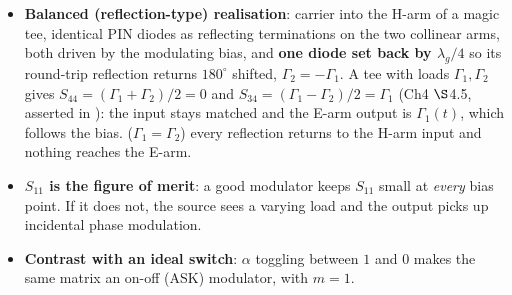 \begin{itemize}
  \item \textbf{Balanced (reflection-type) realisation}: carrier into the H-arm of a magic
    tee, identical PIN diodes as reflecting terminations on the two collinear arms, both
    driven by the modulating bias, and \textbf{one diode set back by $\lambda_g/4$} so its
    round-trip reflection returns $180^\circ$ shifted, $\Gamma_2 = -\Gamma_1$. A tee with
    loads $\Gamma_1, \Gamma_2$ gives $S_{44} = (\Gamma_1 + \Gamma_2)/2 = 0$ and
    $S_{34} = (\Gamma_1 - \Gamma_2)/2 = \Gamma_1$ (Ch4 $\S$4.5, asserted in ):
    the input stays matched and the E-arm output is $\Gamma_1(t)$, which follows the bias.
     ($\Gamma_1 = \Gamma_2$) every reflection returns to the
    H-arm input and nothing reaches the E-arm. \added{}
  \item \textbf{$S_{11}$ is the figure of merit}: a good modulator keeps $S_{11}$ small at
    \emph{every} bias point. If it does not, the source sees a varying load and the output
    picks up incidental phase modulation.
  \item \textbf{Contrast with an ideal switch}: $\alpha$ toggling between $1$ and $0$ makes
    the same matrix an on-off (ASK) modulator, with $m = 1$.
\end{itemize}

\vspace{2pt}
